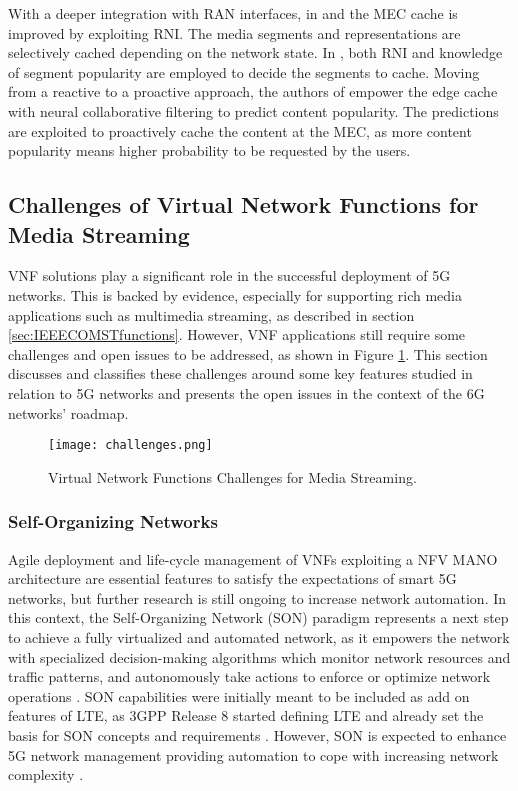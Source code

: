With a deeper integration with RAN interfaces, in \cite{Tan2018} and \cite{Martin2019} the MEC cache is improved by exploiting RNI. The media segments and representations are selectively cached depending on the network state. In \cite{Ge2016}, both RNI and knowledge of segment popularity are employed to decide the segments to cache.
Moving from a reactive to a proactive approach, the authors of \cite{chen2020} empower the edge cache with neural collaborative filtering to predict content popularity. The predictions are exploited to proactively cache the content at the MEC, as more content popularity means higher probability to be requested by the users.

\subsection{Challenges of Virtual Network Functions for Media Streaming}
\label{sec:IEEECOMSTchallenges}

VNF solutions play a significant role in the successful deployment of 5G networks. This is backed by evidence, especially for supporting rich media applications such as multimedia streaming, as described in section \ref{sec:IEEECOMSTfunctions}. However, VNF applications still require some challenges and open issues to be addressed, as shown in Figure \ref{fig:IEEECOMSTchallenges}. This section discusses and classifies these challenges around some key features studied in relation to 5G networks and presents the open issues in the context of the 6G networks' roadmap.

\begin{figure}[htp]
	\centering
	\texttt{[image: challenges.png]}
	\caption{Virtual Network Functions Challenges for Media Streaming.}
	\label{fig:IEEECOMSTchallenges}
	\vspace{-0.5cm}
\end{figure}

\subsubsection{Self-Organizing Networks}

Agile deployment and life-cycle management of VNFs exploiting a NFV MANO architecture are essential features to satisfy the expectations of smart 5G networks, but further research is still ongoing to increase network automation. In this context, the Self-Organizing Network (SON) paradigm \cite{ETSI2020} represents a next step to achieve a fully virtualized and automated network, as it empowers the network with specialized decision-making algorithms which monitor network resources and traffic patterns, and autonomously take actions to enforce or optimize network operations \cite{Aliu2012}. SON capabilities were initially meant to be included as add on features of LTE, as 3GPP Release 8 started defining LTE and already set the basis for SON concepts and requirements \cite{Hu2010}.
However, SON is expected to enhance 5G network management providing automation to cope with increasing network complexity \cite{Moysen2018}.

